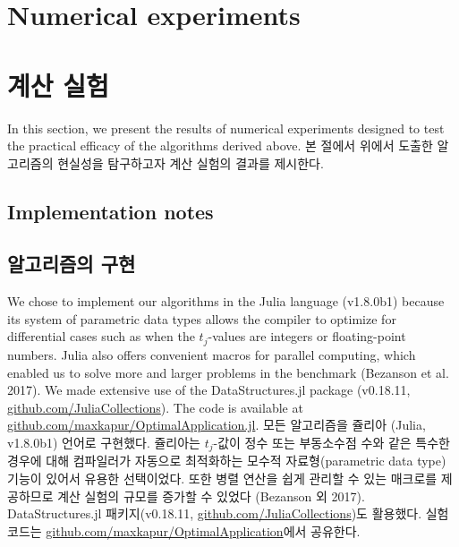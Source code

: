 \documentclass[11pt]{article} %
\theoremstyle{definition}
\theoremstyle{definition}
\begin{document}




\ifen \section{Numerical experiments} \else \section{계산 실험}\fi\label{numericalexperiments}
\ifen
In this section, we present the results of numerical experiments designed to test the practical efficacy of the algorithms derived above. 
\else
본 절에서 위에서 도출한 알고리즘의 현실성을 탐구하고자 계산 실험의 결과를 제시한다.
\fi

\ifen \subsection{Implementation notes} \else \subsection{알고리즘의 구현}\fi
\ifen
We chose to implement our algorithms in the Julia language (v1.8.0b1) because its system of parametric data types allows the compiler to optimize for differential cases such as when the $t_j$-values are integers or floating-point numbers. Julia also offers convenient macros for parallel computing, which enabled us to solve more and larger problems in the benchmark (Bezanson et al. 2017). We made extensive use of the DataStructures.jl package (v0.18.11, \url{github.com/JuliaCollections}). The code is available at \url{github.com/maxkapur/OptimalApplication.jl}. %
\else
모든 알고리즘을 쥴리아 (Julia, v1.8.0b1) 언어로 구현했다. 쥴리아는 $t_j$-값이 정수 또는 부동소수점 수와 같은 특수한 경우에 대해 컴파일러가 자동으로 최적화하는 모수적 자료형(parametric data type) 기능이 있어서 유용한 선택이었다. 또한 병렬 연산을 쉽게 관리할 수 있는 매크로를 제공하므로 계산 실험의 규모를 증가할 수 있었다 (Bezanson 외 2017). DataStructures.jl 패키지(v0.18.11, \url{github.com/JuliaCollections})도 활용했다. 실험 코드는  \url{github.com/maxkapur/OptimalApplication}에서 공유한다.
\fi
\end{document}
